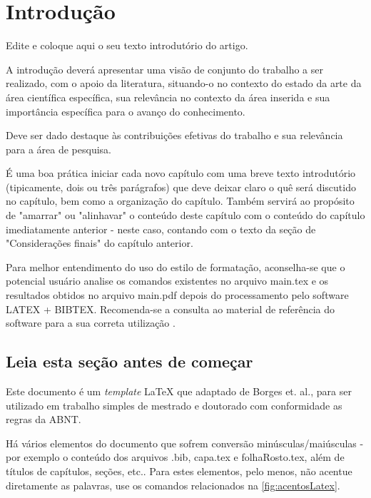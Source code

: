 


\chapter{Introdução}
\label{chap:introducao}

Edite e coloque aqui o seu texto introdutório do artigo.

A introdução deverá apresentar uma visão de conjunto do trabalho a ser realizado, com o apoio da literatura, situando-o no contexto do estado da arte da área científica específica, sua relevância no contexto da área inserida e sua importância específica para o avanço do conhecimento.

Deve ser dado destaque às contribuições efetivas do trabalho e sua relevância para a área de pesquisa.

É uma boa prática iniciar cada novo capítulo com uma breve texto introdutório (tipicamente, dois ou três parágrafos) que deve deixar claro o quê será discutido no capítulo, bem como a organização do capítulo. Também servirá ao propósito de "amarrar"{} ou "alinhavar"{}  o conteúdo deste capítulo com o conteúdo do capítulo imediatamente anterior - neste caso, contando  com o texto da seção de "Considerações finais"{}  do capítulo anterior.

Para melhor entendimento do uso do estilo de formatação, aconselha-se que o potencial usuário analise os comandos existentes no arquivo {\ttfamily main.tex} e os resultados obtidos no arquivo {\ttfamily main.pdf} depois do processamento pelo software LATEX + BIBTEX.
Recomenda-se a consulta ao material de referência do software para a sua correta utilização \cite{Lamport1986,Buerger1989,Kopka2003,Mittelbach2004}.



\section{Leia esta seção antes de começar }
\label{sec:antesleiame}

Este documento é um \emph{template} \LaTeX{} que adaptado de Borges et. al., para ser utilizado em trabalho simples de mestrado e doutorado com conformidade as regras da ABNT. 

Há vários elementos do documento que sofrem conversão minúsculas/maiúsculas - por exemplo o conteúdo dos arquivos {\ttfamily .bib}, {\ttfamily capa.tex} e {\ttfamily folhaRosto.tex}, além de títulos de capítulos, seções, etc.. Para estes elementos, pelo menos, não acentue diretamente as palavras, use os comandos relacionados na \autoref{fig:acentosLatex}.

